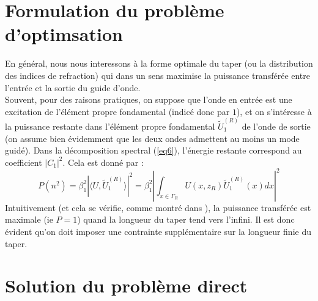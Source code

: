 \documentclass{article}
\begin{document}
\section{Formulation du problème d'optimsation}
En général, nous nous interessons à la forme optimale du taper (ou la distribution des indices de refraction) qui dans un sens maximise la puissance transférée entre l'entrée et la sortie du guide d'onde.\\
Souvent, pour des raisons pratiques, on suppose que l'onde en entrée est une excitation de l'élément propre fondamental (indicé donc par $1$), et on s'intéresse à la puissance restante dans l'élément propre fondamental $\tilde{U}^{(R)}_1$ de l'onde de sortie (on assume bien évidemment que les deux ondes admettent au moins un mode guidé). Dans la décomposition spectral (\ref{eq6}), l'énergie restante correspond au coefficient $|C_1|^2$. Cela est donné par :
\begin{equation}\label{eq11} P(n^2)=\beta_1^2|\langle U,\tilde{U}_1^{(R)}\rangle|^2=\beta_1^2\left|\int_{x\in\Gamma_R} U(x,z_R)\tilde{U}_1^{(R)}(x)dx\right|^2\end{equation}
Intuitivement (et cela se vérifie, comme montré dans \cite{Snyd}), la puissance transférée est maximale (ie $P=1$) quand la longueur du taper tend vers l'infini. Il est donc évident qu'on doit imposer une contrainte supplémentaire sur la longueur finie du taper.

\section{Solution du problème direct}
\end{document}
